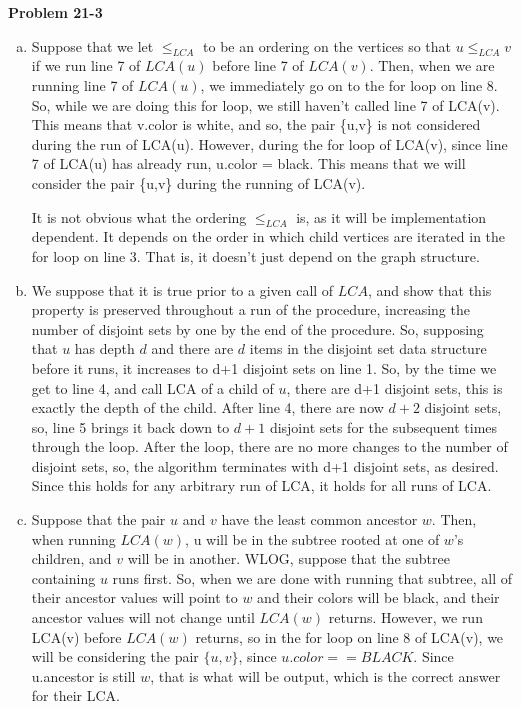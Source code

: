 \documentclass{article}
\begin{document}
\noindent\textbf{Problem 21-3}\\

\begin{enumerate}[a.]
\item

Suppose that we let $\le_{LCA}$ to be an ordering on the vertices so that $u\le_{LCA} v$ if we run line 7 of $LCA(u)$ before line 7 of $LCA(v)$. Then, when we are running line 7 of $LCA(u)$, we immediately go on to the for loop on line 8. So, while we are doing this for loop, we still haven't called line 7 of LCA(v). This means that v.color is white, and so, the pair \{u,v\} is not considered during the run of LCA(u). However, during the for loop of LCA(v), since line 7 of LCA(u) has already run, u.color = black. This means that we will consider the pair \{u,v\} during the running of LCA(v).

It is not obvious what the ordering $\le_{LCA}$ is, as it will be implementation dependent. It depends on the order in which child vertices are iterated in the for loop on line 3. That is, it doesn't just depend on the graph structure.

\item
We suppose that it is true prior to a given call of $LCA$, and show that this property is preserved throughout a run of the procedure, increasing the number of disjoint sets by one by the end of the procedure. So, supposing that $u$ has depth $d$ and there are $d$ items in the disjoint set data structure before it runs, it increases to d+1 disjoint sets on line 1. So, by the time we get to line 4, and call LCA of a child of $u$, there are d+1 disjoint sets, this is exactly the depth of the child. After line 4, there are now $d+2$ disjoint sets, so, line 5 brings it back down to $d+1$ disjoint sets for the subsequent times through the loop. After the loop, there are no more changes to the number of disjoint sets, so, the algorithm terminates with d+1 disjoint sets, as desired. Since this holds for any arbitrary run of LCA, it holds for all runs of LCA.

\item
Suppose that the pair $u$ and $v$ have the least common ancestor $w$. Then, when running $LCA(w)$, u will be in the subtree rooted at one of $w$'s children, and $v$ will be in another. WLOG, suppose that the subtree containing $u$ runs first. So, when we are done with running that subtree, all of their ancestor values will point to $w$ and their colors will be black, and their ancestor values will not change until $LCA(w)$ returns. However, we run LCA(v) before $LCA(w)$ returns, so in the for loop on line 8 of LCA(v), we will be considering the pair $\{u,v\}$, since $u.color==BLACK$. Since u.ancestor is still $w$, that is what will be output, which is the correct answer for their LCA.


\end{enumerate}
\end{document}
